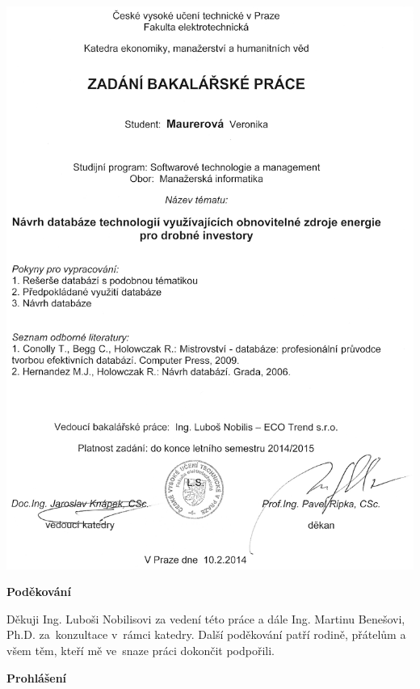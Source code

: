 \documentclass[11pt,a4paper]{article}
\begin{document}
\thispagestyle{empty}
\includegraphics[scale=0.9]{zadani}
\newpage

\thispagestyle{empty}
\vspace*{20cm}
{\Huge \noindent \textbf{Poděkování}}
\vspace{1cm}

\begin{large}
\noindent Děkuji Ing. Luboši Nobilisovi za vedení této práce a dále Ing. Martinu Benešovi, Ph.D. za~konzultace v~rámci katedry. Další poděkování patří
rodině, přátelům a všem těm, kteří mě ve~snaze práci dokončit podpořili.
\end{large}
\newpage

\thispagestyle{empty}
\vspace*{13.5cm}
{\Huge \noindent \textbf{Prohlášení}}
\vspace{1cm}
\end{document}
